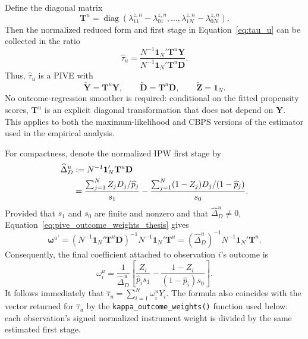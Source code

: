 \documentclass[12pt, a4paper, oneside]{article}
\theoremstyle{plain}
\theoremstyle{definition}
\begin{document}
Define the diagonal matrix
\begin{equation}
    \mathbf T^u
    =\operatorname{diag}\!\left(
      \lambda_{11}^{z,n}-\lambda_{01}^{z,n},\ldots,
      \lambda_{1N}^{z,n}-\lambda_{0N}^{z,n}
    \right).
    \label{eq:u_T_matrix}
\end{equation}
Then the normalized reduced form and first stage in
Equation~\eqref{eq:tau_u} can be collected in the ratio
\begin{equation}
    \widehat\tau_u
    =\frac{N^{-1}\mathbf 1_N'\mathbf T^u\mathbf Y}
           {N^{-1}\mathbf 1_N'\mathbf T^u\mathbf D}.
    \label{eq:u_wald_matrix}
\end{equation}
Thus, \(\widehat\tau_u\) is a PIVE with
\begin{equation}
    \widetilde{\mathbf Y}=\mathbf T^u\mathbf Y,
    \qquad
    \widetilde{\mathbf D}=\mathbf T^u\mathbf D,
    \qquad
    \widetilde{\mathbf Z}=\mathbf 1_N.
    \label{eq:u_pive_components}
\end{equation}
No outcome-regression smoother is required: conditional on the fitted
propensity scores, \(\mathbf T^u\) is an explicit diagonal transformation that
does not depend on \(\mathbf Y\). This applies to both the maximum-likelihood
and CBPS versions of the estimator used in the empirical analysis.

For compactness, denote the normalized IPW first stage by
\begin{align}
    \widehat\Delta_D^u
    &:=N^{-1}\mathbf 1_N'\mathbf T^u\mathbf D \notag\\
    &=\frac{\sum_{j=1}^{N}Z_jD_j/\widehat p_j}{s_1}
      -\frac{\sum_{j=1}^{N}(1-Z_j)D_j/(1-\widehat p_j)}{s_0}.
    \label{eq:u_delta_scalar}
\end{align}
Provided that \(s_1\) and \(s_0\) are finite and nonzero and that
\(\widehat\Delta_D^u\neq0\), Equation~\eqref{eq:pive_outcome_weights_thesis}
gives
\begin{equation}
    \boldsymbol\omega^{u\prime}
    =\left(N^{-1}\mathbf 1_N'\mathbf T^u\mathbf D\right)^{-1}
      N^{-1}\mathbf 1_N'\mathbf T^u
    =\left(\widehat\Delta_D^u\right)^{-1}
      N^{-1}\mathbf 1_N'\mathbf T^u.
    \label{eq:u_omega_matrix}
\end{equation}
Consequently, the final coefficient attached to observation \(i\)'s outcome is
\begin{equation}
    \boxed{
    \omega_i^u
    =\frac{1}{\widehat\Delta_D^u}
      \left[
        \frac{Z_i}{\widehat p_i s_1}
        -\frac{1-Z_i}{(1-\widehat p_i)s_0}
      \right].}
    \label{eq:u_omega_scalar}
\end{equation}
It follows immediately that
\(\widehat\tau_u=\sum_{i=1}^{N}\omega_i^uY_i\). The formula also coincides
with the vector returned for \(\widehat\tau_u\) by the
\texttt{kappa\_outcome\_weights()} function used below: each observation's
signed normalized instrument weight is divided by the same estimated first
stage.
\end{document}
